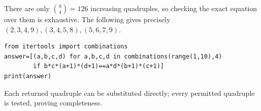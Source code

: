 There are only $\binom94=126$ increasing quadruples, so checking the exact equation over them is exhaustive. The following gives precisely $\boxed{(2,3,4,9),(3,4,5,8),(5,6,7,9)}$.
\begin{verbatim}
from itertools import combinations
answer=[(a,b,c,d) for a,b,c,d in combinations(range(1,10),4)
        if b*c*(a+1)*(d+1)==a*d*(b+1)*(c+1)]
print(answer)
\end{verbatim}
Each returned quadruple can be substituted directly; every permitted quadruple is tested, proving completeness.
